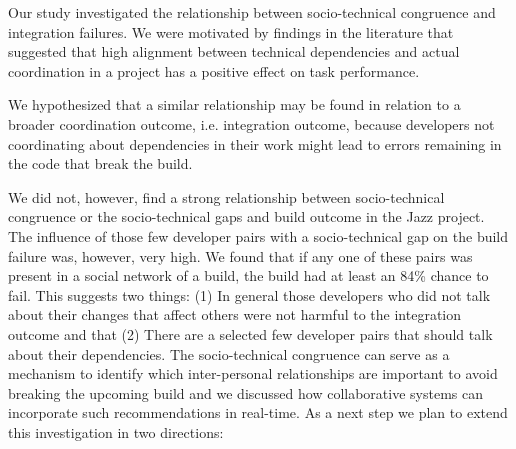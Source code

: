 \documentclass{sig-alternate}
\begin{document}
Our study investigated the relationship between socio-technical congruence and integration failures.
We were motivated by findings in the literature that suggested that high
alignment between technical dependencies and actual coordination in a project has a positive effect on task performance.

We hypothesized that a similar relationship may be found in relation to a
broader coordination outcome, i.e. integration outcome, because developers not coordinating about dependencies in their work might lead to errors remaining in the code that break the build.

We did not, however, find a strong relationship between socio-technical
congruence or the socio-technical gaps and build outcome in the Jazz project. The
influence of those few developer pairs with a socio-technical gap on the build
failure was, however, very high. We found that if any one of these pairs was
present in a social network of a build, the build had at least an 84\% chance to
fail. This suggests two things: (1) In general those developers who did not talk
about their changes that affect others were not harmful to the integration
outcome and that (2) There are a selected few developer pairs that should
talk about their dependencies. The socio-technical congruence can serve as a
mechanism to identify which inter-personal relationships are important to avoid
breaking the upcoming build and we discussed how collaborative systems can
incorporate such recommendations in real-time. As a next step we plan to extend
this investigation in two directions:
\end{document}
